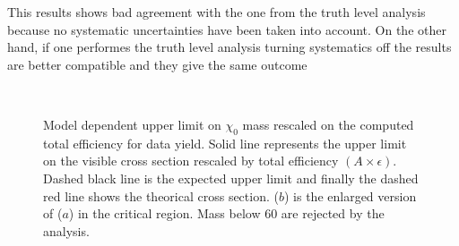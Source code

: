 This results shows bad agreement with the one from the truth level analysis because no  systematic uncertainties have been taken into account. On the other hand, if one performes the truth level analysis turning systematics off the results are better compatible and they give the same outcome



\begin{figure}[tp]
\centering
{} \\
 \quad
\caption{Model dependent upper limit on $\chi_0$ mass rescaled on the computed total efficiency for data yield. Solid line represents the upper limit on the visible cross section rescaled by total efficiency $\left(A\times\epsilon\right)$. Dashed black line is the expected upper limit and finally the dashed red line shows the theorical cross section. ($b$) is the enlarged version of ($a$) in the critical region. Mass below \SI{60}{\gev} are rejected by the analysis.}
\label{fig:exclMI}
\end{figure}










